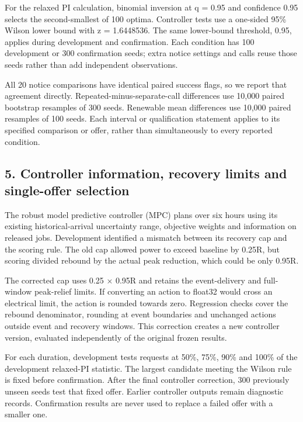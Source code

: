 \documentclass[10pt,a4paper]{article}
\begin{document}
For the relaxed PI calculation, binomial inversion at q = 0.95 and confidence 0.95 selects the second-smallest of 100 optima. Controller tests use a one-sided 95\% Wilson lower bound with z = 1.6448536. The same lower-bound threshold, 0.95, applies during development and confirmation. Each condition has 100 development or 300 confirmation seeds; extra notice settings and calls reuse those seeds rather than add independent observations.


All 20 notice comparisons have identical paired success flags, so we report that agreement directly. Repeated-minus-separate-call differences use 10,000 paired bootstrap resamples of 300 seeds. Renewable mean differences use 10,000 paired resamples of 100 seeds. Each interval or qualification statement applies to its specified comparison or offer, rather than simultaneously to every reported condition.


\subsection{5. Controller information, recovery limits and single-offer selection}

The robust model predictive controller (MPC) plans over six hours using its existing historical-arrival uncertainty range, objective weights and information on released jobs. Development identified a mismatch between its recovery cap and the scoring rule. The old cap allowed power to exceed baseline by 0.25R, but scoring divided rebound by the actual peak reduction, which could be only 0.95R.


The corrected cap uses 0.25 × 0.95R and retains the event-delivery and full-window peak-relief limits. If converting an action to float32 would cross an electrical limit, the action is rounded towards zero. Regression checks cover the rebound denominator, rounding at event boundaries and unchanged actions outside event and recovery windows. This correction creates a new controller version, evaluated independently of the original frozen results.


For each duration, development tests requests at 50\%, 75\%, 90\% and 100\% of the development relaxed-PI statistic. The largest candidate meeting the Wilson rule is fixed before confirmation. After the final controller correction, 300 previously unseen seeds test that fixed offer. Earlier controller outputs remain diagnostic records. Confirmation results are never used to replace a failed offer with a smaller one.
\end{document}
